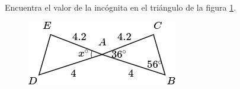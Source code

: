 Encuentra el valor de la incógnita en el triángulo de la figura \ref{fig:angle_triangle_11}.

\begin{minipage}[t][5cm][b]{0.3\textwidth}
    \begin{figure}[H]
        \centering
        \includegraphics[width=0.9\linewidth]{../images/angle_triangle_11.png}

        \caption{}
        \label{fig:angle_triangle_11}
    \end{figure}
\end{minipage}\hfill
\begin{minipage}[t]{0.65\textwidth}
    \begin{solutionbox}{5cm}

    \end{solutionbox}
\end{minipage}
